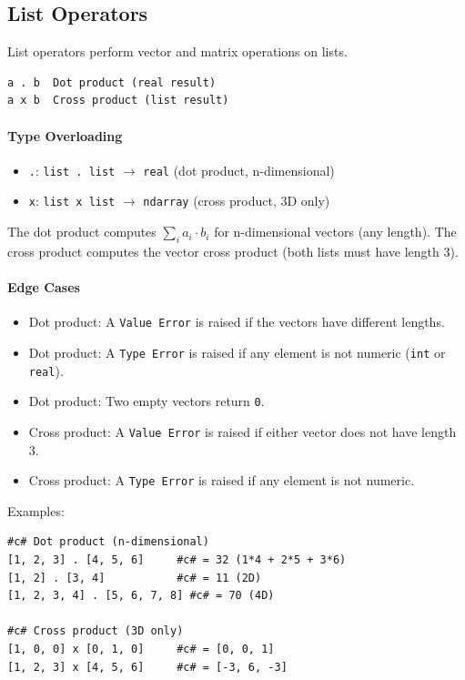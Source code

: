 \subsection{List Operators}
List operators perform vector and matrix operations on lists.
\begin{verbatim}
a . b  Dot product (real result)
a x b  Cross product (list result)
\end{verbatim}

\paragraph{Type Overloading}
\begin{itemize}
\item \texttt{.}: \texttt{list . list} $\rightarrow$ \texttt{real} (dot product, n-dimensional)
\item \texttt{x}: \texttt{list x list} $\rightarrow$ \texttt{ndarray} (cross product, 3D only)
\end{itemize}

The dot product computes $\sum_{i} a_i \cdot b_i$ for n-dimensional vectors (any length). The cross product computes the vector cross product (both lists must have length 3).

\paragraph{Edge Cases}
\begin{itemize}
\item Dot product: A \texttt{Value Error} is raised if the vectors have different lengths.
\item Dot product: A \texttt{Type Error} is raised if any element is not numeric (\texttt{int} or \texttt{real}).
\item Dot product: Two empty vectors return \texttt{0}.
\item Cross product: A \texttt{Value Error} is raised if either vector does not have length 3.
\item Cross product: A \texttt{Type Error} is raised if any element is not numeric.
\end{itemize}

Examples:
\begin{verbatim}
#c# Dot product (n-dimensional)
[1, 2, 3] . [4, 5, 6]     #c# = 32 (1*4 + 2*5 + 3*6)
[1, 2] . [3, 4]           #c# = 11 (2D)
[1, 2, 3, 4] . [5, 6, 7, 8] #c# = 70 (4D)

#c# Cross product (3D only)
[1, 0, 0] x [0, 1, 0]     #c# = [0, 0, 1]
[1, 2, 3] x [4, 5, 6]     #c# = [-3, 6, -3]
\end{verbatim}

